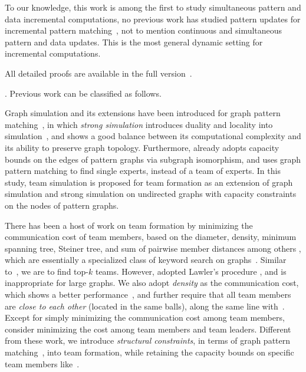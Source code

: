 To our knowledge, this work is among the first to study simultaneous pattern and data incremental computations, no previous work has studied pattern updates for incremental pattern matching~\cite{FanHT17,FanWW13-tods}, not to mention continuous and simultaneous pattern and data updates.  This is  the most general dynamic setting for incremental computations.

All detailed proofs are available  in the full version~\cite{fullvldb18}.

. Previous work can be classified as follows.


 Graph simulation \cite{infsimu95} and its extensions have been introduced for graph pattern matching~\cite{FanLMTWW10,MaCFHW14,Guanfeng15,FanCount16}, in which {\em strong simulation} introduces duality and locality into simulation~\cite{MaCFHW14}, and shows a good balance between its computational complexity and its ability to preserve graph topology. Furthermore, \cite{FanCount16} already adopts capacity bounds on the edges of pattern graphs via subgraph isomorphism, and \cite{FanWWXin13} uses graph pattern matching to find single experts, instead of a team of experts. In this study, team simulation is proposed for team formation as an extension of graph simulation and strong simulation on undirected graphs with capacity constraints on the nodes of pattern graphs.



There has been a host of work on team formation by minimizing the communication cost of team members, based on the diameter, density, minimum spanning tree, Steiner tree, and sum of pairwise member distances among others \cite{Lappas09,Kargar11,ArisLuca12,GajewarS12,realTeamForm13,SamikKVM12,LiTongCao15}, which are essentially  a specialized class of keyword search on graphs~\cite{Aggarwal10}. Similar to~\cite{Kargar11}, we are to find top-$k$ teams. However, \cite{Kargar11} adopted Lawler's procedure \cite{Lawler1972}, and is inappropriate for large graphs. We also adopt {\em density}  as the communication cost, which shows a better performance~\cite{GajewarS12}, and further require that all team members are {\em close to each other} (located in the same balls), along the same line with~\cite{Lappas09,Kargar11,ArisLuca12,SamikKVM12}.
Except for simply minimizing the communication cost among team members,
\cite{HuangLv16,Kargar11} consider minimizing the cost among team members and team leaders.
Different from these work, we introduce {\em structural constraints}, in terms of graph pattern matching~\cite{FanLMTWW10,MaCFHW14}, into team formation, while retaining the capacity bounds on specific team members like~\cite{realTeamForm13,GajewarS12}.



